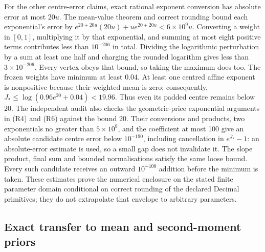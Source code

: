 For the other centre-error claims, exact rational exponent conversion has
absolute error at most \(20u\). The mean-value theorem and correct
rounding bound each exponential's error by
\(e^{20+20u}(20u)+u e^{20+20u}<6\times10^9u\).
Converting a weight in \([0,1]\), multiplying it by that exponential,
and summing at most eight positive terms contributes less than
\(10^{-206}\) in total. Dividing the logarithmic perturbation by a sum
at least one half and charging the rounded logarithm gives less than
\(3\times10^{-206}\). Every vertex obeys that bound, so taking the
maximum does too. The frozen weights have minimum at least 0.04. At least
one centred affine exponent is nonpositive because their weighted mean
is zero; consequently,
\(J_*\leq\log(0.96e^{20}+0.04)<19.96\).
Thus even its padded centre remains below 20. The independent audit also
checks the geometric-price exponential arguments in (R4) and (R6) against
the bound 20. Their conversions and products, two exponentials no greater
than \(5\times10^8\), and the coefficient at most 100 give an absolute
candidate centre error below \(10^{-190}\), including cancellation in
\(e^{\overline J_*}-1\): an absolute-error estimate is used, so a small
gap does not invalidate it. The slope product, final sum and bounded
normalisations satisfy the same loose bound. Every such candidate receives
an outward \(10^{-100}\) addition before the minimum is taken.
These estimates prove the numerical enclosure on the stated finite
parameter domain conditional on correct rounding of the declared Decimal
primitives; they do not extrapolate that envelope to arbitrary parameters.

\subsection{Exact transfer to mean and second-moment priors}

